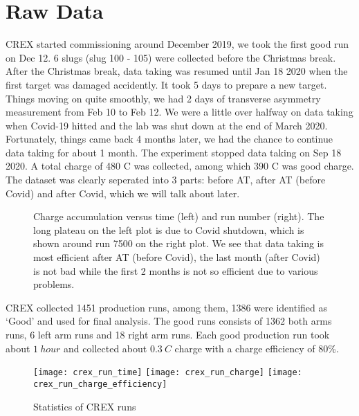 \section{Raw Data}
CREX started commissioning around December 2019, we took the first good run on 
Dec 12. 6 slugs (slug 100 - 105) were collected before the Christmas break. After 
the Christmas break, data taking was resumed until Jan 18 2020 when the first \Ca 
target was damaged accidently. It took 5 days to prepare a new \Ca target.
Things moving on quite smoothly, we had 2 days of transverse asymmetry 
measurement from Feb 10 to Feb 12. We were a little over halfway on data taking 
when Covid-19 hitted and the lab was shut down at the end of March 2020. Fortunately,
things came back 4 months later, we had the chance to continue data taking for
about 1 month. The experiment stopped data taking on Sep 18 2020. A total charge
of 480 C was collected, among which 390 C was good charge. The dataset was clearly
seperated into 3 parts: before AT, after AT (before Covid) and after Covid, which
we will talk about later.
\begin{figure}[h!]
    \caption{Charge accumulation versus time (left) and run number (right). The
    long plateau on the left plot is due to Covid shutdown, which is shown around
    run 7500 on the right plot. We see that data taking is most efficient after
    AT (before Covid), the last month (after Covid) is not bad while the 
    first 2 months is not so efficient due to various problems.}
\end{figure}

CREX collected 1451 production runs, among them, 1386 were identified as `Good'
and used for final analysis. The good runs consists of 1362 both arms runs,
6 left arm runs and 18 right arm runs. Each good production run took about $1\ hour$
and collected about $0.3\ C$ charge with a charge efficiency of 80\%.
\begin{figure}[h!]
    \texttt{[image: crex\_run\_time]}
    \texttt{[image: crex\_run\_charge]}
    \texttt{[image: crex\_run\_charge\_efficiency]}
    \caption{Statistics of CREX runs}
\end{figure}

